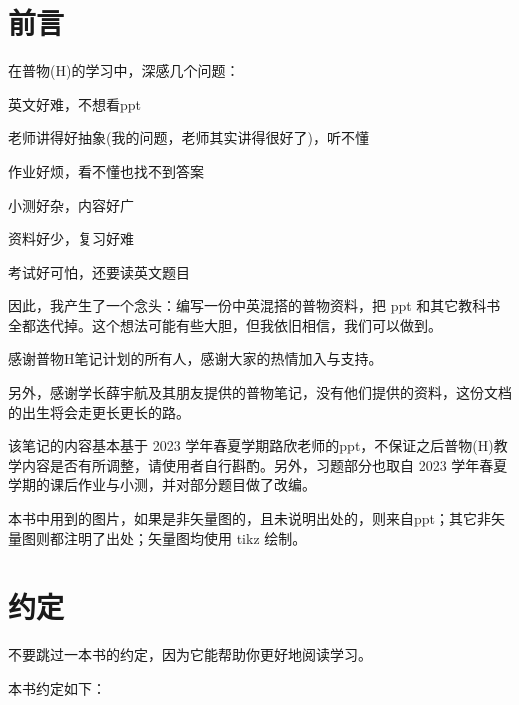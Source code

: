 \chapter{前言}
在普物(H)的学习中，深感几个问题：
\begin{Itemize}
    \item 英文好难，不想看ppt
    \item 老师讲得好抽象(我的问题，老师其实讲得很好了)，听不懂
    \item 作业好烦，看不懂也找不到答案
    \item 小测好杂，内容好广
    \item 资料好少，复习好难
    \item 考试好可怕，还要读英文题目
\end{Itemize}

因此，我产生了一个念头：编写一份中英混搭的普物资料，把 ppt 和其它教科书全都迭代掉。这个想法可能有些大胆，但我依旧相信，我们可以做到。

感谢普物H笔记计划的所有人，感谢大家的热情加入与支持。

另外，感谢学长薛宇航及其朋友提供的普物笔记，没有他们提供的资料，这份文档的出生将会走更长更长的路。

该笔记的内容基本基于 2023 学年春夏学期路欣老师的ppt，不保证之后普物(H)教学内容是否有所调整，请使用者自行斟酌。另外，习题部分也取自 2023 学年春夏学期的课后作业与小测，并对部分题目做了改编。

本书中用到的图片，如果是非矢量图的，且未说明出处的，则来自ppt；其它非矢量图则都注明了出处；矢量图均使用 tikz 绘制。
\chapter{约定}
不要跳过一本书的约定，因为它能帮助你更好地阅读学习。

本书约定如下：
\setcounter{chapter}{-1}

